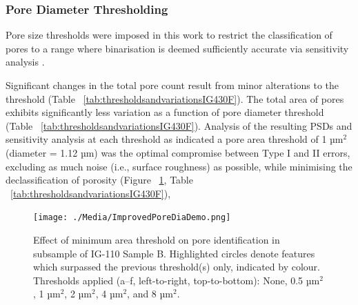 \documentclass[review]{elsarticle}
\begin{document}
	\subsubsection{Pore Diameter Thresholding}
    
  Pore size thresholds were imposed in this work to restrict the classification
  of pores to a range where binarisation is deemed sufficiently accurate via
  sensitivity analysis \citep{Taylor2016, Huang2019, Kane2011a}. 
      
  Significant changes in the total pore count result from minor alterations to
  the threshold (Table ~\ref{tab:thresholdsandvariationsIG430F}). The total area
  of pores exhibits significantly less variation as a function of pore diameter
  threshold (Table ~\ref{tab:thresholdsandvariationsIG430F}). Analysis of the
  resulting PSDs and sensitivity analysis at each threshold as indicated a pore
  area threshold of 1 µm\(^2\) (diameter = 1.12 µm) was the optimal compromise
  between Type I and II errors, excluding as much noise (i.e., surface
  roughness) as possible, while minimising the declassification of porosity
  (Figure ~\ref{fig:improvedporediademo}, Table
  ~\ref{tab:thresholdsandvariationsIG430F}),

   \begin{table}
  \centering
  \caption{Effect of different pore area thresholds on a subsection of IG-430F, showing the resulting pore count, total area, average pore size, and percentage area.}
  \label{tab:thresholdsandvariationsIG430F}
\end{table}

\begin{figure}[!htbp]
    \centering
    \texttt{[image: ./Media/ImprovedPoreDiaDemo.png]}
    \caption{Effect of minimum area threshold on pore identification in subsample of IG-110 Sample B. Highlighted circles denote features which surpassed the previous threshold(s) only, indicated by colour. Thresholds applied (a–f, left-to-right, top-to-bottom): None, 0.5 µm\(^2\), 1 µm\(^2\), 2 µm\(^2\), 4 µm\(^2\), and 8 µm\(^2\).}
    \label{fig:improvedporediademo}
\end{figure}
\end{document}
